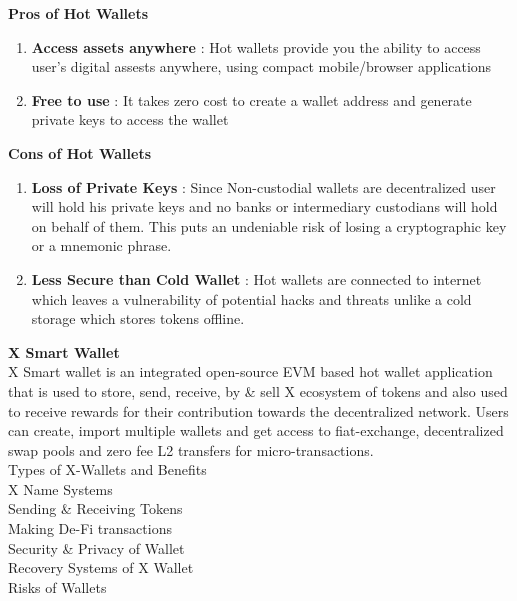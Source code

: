 \documentclass[letterpaper,11pt]{article}
\begin{document}
\textbf{Pros of Hot Wallets}
\begin{enumerate}[wide, labelwidth=!, labelindent=0pt]
\item \textbf{Access assets anywhere} : Hot wallets provide you the ability to access user's digital assests anywhere, using compact mobile/browser applications
\item \textbf{Free to use} : It takes zero cost to create a wallet address and generate private keys to access the wallet
\end{enumerate}

\textbf{Cons of Hot Wallets}
\begin{enumerate}[wide, labelwidth=!, labelindent=0pt]
\item \textbf{Loss of Private Keys} : Since Non-custodial wallets are decentralized user will hold his private keys and no banks or intermediary custodians will hold on behalf of them. This puts an undeniable risk of losing a cryptographic key or a mnemonic phrase.
\item \textbf{Less Secure than Cold Wallet} : Hot wallets are connected to internet which leaves a vulnerability of potential hacks and threats unlike a cold storage which stores tokens offline.
\end{enumerate}


\textbf{X Smart Wallet}\\

X Smart wallet is an integrated open-source EVM based hot wallet application that is used to store, send, receive, by \& sell X ecosystem of tokens and also used to receive rewards for their contribution towards the decentralized network. Users can create, import multiple wallets and get access to fiat-exchange, decentralized swap pools and zero fee L2 transfers for micro-transactions. \\

Types of X-Wallets and Benefits\\

X Name Systems\\

Sending \& Receiving Tokens\\

Making De-Fi transactions\\

Security \& Privacy of Wallet\\

Recovery Systems of X Wallet\\

Risks of Wallets\\
\end{document}
